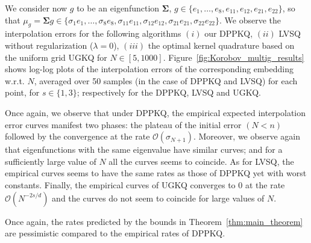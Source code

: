 \documentclass[twoside,11pt]{book}
\numberwithin{theorem}{chapter}
\numberwithin{definition}{chapter}
\numberwithin{proposition}{chapter}
\numberwithin{corollary}{chapter}
\numberwithin{example}{chapter}
\numberwithin{lemma}{chapter}
\numberwithin{assumption}{chapter}
\begin{document}
We consider now $g$ to be an eigenfunction $\bm{\Sigma}$, $g \in \{e_{1},\dots,e_{8},e_{11},e_{12},e_{21},e_{22}\}$, so that $\mu_{g} = \bm{\Sigma}g \in \{\sigma_{1}e_{1},\dots,\sigma_{8}e_{8},\sigma_{11}e_{11},\sigma_{12}e_{12},\sigma_{21}e_{21},\sigma_{22}e_{22}\}$. We observe the interpolation errors for the following algorithms $(i)$ our DPPKQ, $(ii)$ LVSQ without regularization ($\lambda =0$), $(iii)$ the optimal kernel quadrature based on the uniform grid UGKQ for $N \in [5,1000]$. Figure~\ref{fig:Korobov_multig_results} shows log-log plots of the interpolation errors of the corresponding embedding  w.r.t. $N$, averaged over 50 samples (in the case of DPPKQ and LVSQ) for each point, for $s \in \{1,3\}$; respectively for the DPPKQ, LVSQ and UGKQ.

Once again, we observe that under DPPKQ, the empirical expected interpolation error  curves manifest two phases: the plateau of the initial error $(N<n)$ followed by the convergence at the rate $\mathcal{O}(\sigma_{N+1})$. Moreover, we observe again that eigenfunctions with the same eigenvalue have similar curves; and for a sufficiently large value of $N$ all the curves seems to coincide. As for LVSQ, the empirical curves seems to have the same rates as those of DPPKQ yet with worst constants. Finally, the empirical curves of UGKQ converges to $0$ at the rate $\mathcal{O}(N^{-2s/d})$ and the curves do not seem to coincide for large values of $N$.

Once again, the rates predicted by the bounds in Theorem~\ref{thm:main_theorem} are pessimistic compared to the empirical rates of DPPKQ. 
\end{document}
